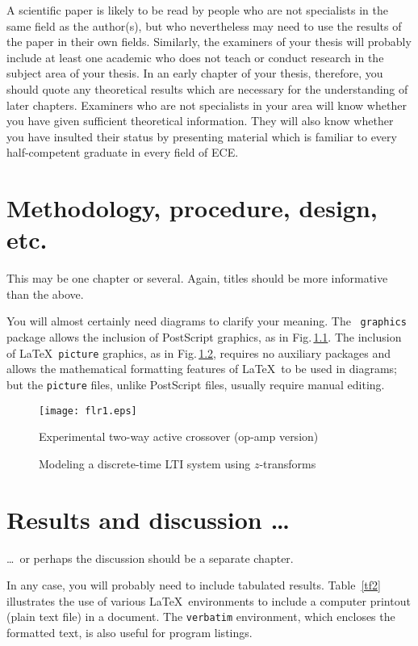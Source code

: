 \documentclass[12pt,openany,a4paper]{book}
\newcommand{\fig}[1]  {Fig.\,\ref{#1}}		%
\newcommand{\tab}[1]  {Table~\ref{#1}}		%
\begin{document}
A scientific paper is likely to be read by people who are not
specialists in the same field as the author(s), but who nevertheless
may need to use the results of the paper in their own fields.
Similarly, the examiners of your thesis will probably include at least
one academic who does not teach or conduct research in the subject
area of your thesis.  In an early chapter of your thesis, therefore,
you should quote any theoretical results which are necessary for the
understanding of later chapters.  Examiners who are not specialists in
your area will know whether you have given sufficient theoretical
information.  They will also know whether you have insulted their
status by presenting material which is familiar to every
half-competent graduate in every field of ECE.

\chapter{Methodology, procedure, design, etc.}

This may be one chapter or several.  Again, titles should be more
informative than the above.

You will almost certainly need diagrams to clarify your meaning.  The
\LaTeXe\ \texttt{graphics} package allows the inclusion of PostScript
graphics, as in \fig{flr1}.  The inclusion of \LaTeX\ \texttt{picture}
graphics, as in \fig{fzsys}, requires no auxiliary packages and allows
the mathematical formatting features of \LaTeX\ to be used in
diagrams; but the \texttt{picture} files, unlike PostScript files,
usually require manual editing.

\begin{figure}[htbp]
\centerline{\texttt{[image: flr1.eps]}}
\caption{Experimental two-way active crossover (op-amp version)}
\label{flr1}
\end{figure}

\begin{figure}[htbp]

\caption{Modeling a discrete-time LTI system using $z$-transforms}
\label{fzsys}
\end{figure}

\chapter{Results and discussion \ldots}

\ldots\ or perhaps the discussion should be a separate chapter.

In any case, you will probably need to include tabulated results.
\tab{tf2} illustrates the use of various \LaTeX\ environments to
include a computer printout (plain text file) in a document.  The
\texttt{verbatim} environment, which encloses the formatted text, is
also useful for program listings.
\end{document}
